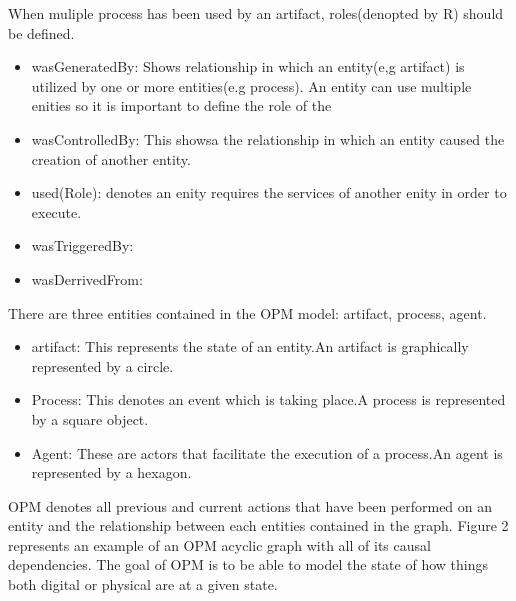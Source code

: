 When muliple process has been used by an artifact, roles(denopted by R) should be defined.

\begin{itemize}
\item wasGeneratedBy: Shows relationship in which an entity(e,g artifact) is utilized by one or  more entities(e.g process). An entity can use multiple enities so it is important to define the role of the  
\item wasControlledBy: This showsa the relationship in which an entity caused the creation of another entity.
\item used(Role): denotes an enity requires the services of another enity in order to execute.
\item wasTriggeredBy: 
\item wasDerrivedFrom:
\end{itemize}

 There are three entities contained in the OPM model: artifact, process, agent. 

\begin{itemize}
\item
artifact: This represents the state of an entity.An artifact is graphically represented by a circle.

\item
Process: This denotes an event which is taking place.A process is represented by a square object.

\item 
Agent: These are actors that facilitate the execution of a process.An agent is represented by a hexagon.
\end{itemize}

OPM denotes all previous and current actions that have been performed on an entity and  the relationship between each entities contained in the graph. Figure 2 represents an example of an OPM acyclic graph with all of its causal dependencies. The goal of OPM is to be able to model the state of how things both digital or physical are at a given state.   

